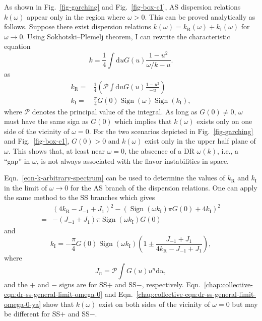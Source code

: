 As shown in Fig.~\ref{fig-garching} and Fig.~\ref{fig-box-c1}, AS dispersion relations $k(\omega)$ appear only in the region where $\omega > 0$. This can be proved analytically as follows.
Suppose there exist dispersion relations $k(\omega) = k_{\mathrm R}(\omega) + k_{\mathrm I}(\omega)$ for $\omega \to 0$. Using Sokhotski–Plemelj theorem, I can rewrite the characteristic equation
\begin{equation}
   k = \frac{1}{4} \int \mathrm du G(u) \frac{ 1 - u^2 }{ \omega/k - u }.
   \label{chap:collective-eqn:k-omega-relation}
\end{equation}
as
\begin{subequations}
\begin{align}
k_{\mathrm R} =& \frac{1}{4}\left(  \mathcal{P} \int \mathrm d u G(u) \frac{ 1 - u^2 }{ - u }  \right)\label{eqn-re-k-arbitrary-spectrum} \\
k_{\mathrm I} =&  \frac{\pi}{4}G(0) \operatorname{Sign}\left( \omega \right) \operatorname{Sign}\left(  k_{\mathrm I}  \right),
\label{eqn-im-k-arbitrary-spectrum}
\end{align}
\label{eqn-k-arbitrary-spectrum}
\end{subequations}
where $\mathcal P$ denotes the principal value of the integral. As long as $G(0)\neq 0$, $\omega$ must have the same sign as $G(0)$ which implies that $k(\omega)$ exists only on one side of the vicinity of $\omega=0$. For the two scenarios depicted in Fig.~\ref{fig-garching} and Fig.~\ref{fig-box-c1}, $G(0)>0$ and $k(\omega)$ exist only in the upper half plane of $\omega$. This shows that, at least near $\omega =0$, the abscence of a DR $\omega(k)$, i.e., a ``gap'' in $\omega$, is not always associated with the flavor instabilities in space.

Eqn.~\ref{eqn-k-arbitrary-spectrum} can be used to determine the values of $k_{\mathrm R}$ and $k_{\mathrm I}$ in the limit of $\omega\to 0$ for the AS branch of the dispersion relations. One can apply the same method to the SS branches which gives
\begin{align}
&\left(4 k_{\mathrm R} - J_{-1} + J_1 \right)^2  - \left( \operatorname{Sign}(\omega k_{\mathrm I} )\pi G(0) +4 k_{\mathrm I} \right)^2 \nonumber\\
=& - \left( J_{-1} + J_1 \right) \pi \operatorname{Sign}(\omega k_{\mathrm I} ) G(0)
\label{chap:collective-eqn:dr-ss-general-limit-omega-0}
\end{align}
and
\begin{equation}
   k_{\mathrm I} = - \frac{\pi}{4} G(0) \operatorname{Sign}(\omega k_{\mathrm I} ) \left(  1 \pm \frac{ J_{-1} +  J_1 }{ 4 k_{\mathrm R} - J_{-1} + J_1}  \right),
   \label{chap:collective-eqn:dr-ss-general-limit-omega-0-ya}
\end{equation}
where
\begin{equation}
J_{n} = \mathcal P \int G(u)u^n \mathrm du,
\end{equation}
and the $+$ and $-$ signs are for SS$+$ and SS$-$, respectively. Eqn.~\ref{chap:collective-eqn:dr-ss-general-limit-omega-0} and Eqn.~\ref{chap:collective-eqn:dr-ss-general-limit-omega-0-ya} show that $k(\omega)$ exist on both sides of the vicinity of $\omega=0$ but may be different for SS$+$ and SS$-$.


